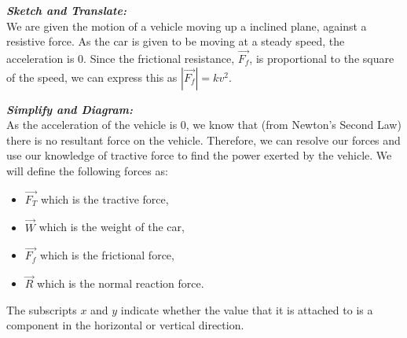 %
%
%


\begin{subquestions}
	
\subquestion

\textbf{\textit{Sketch and Translate:}} \\
We are given the motion of a vehicle moving up a inclined plane, against a resistive force. As the car is given to be moving at a steady speed, the acceleration is 0. Since the frictional resistance, $\vec{F_f}$, is proportional to the square of the speed, we can express this as $|\vec{F_f}| = kv^2$.
	

	
	
\textbf{\textit{Simplify and Diagram:}} \\	
As the acceleration of the vehicle is 0, we know that (from Newton's Second Law) there is no resultant force on the vehicle. Therefore, we can resolve our forces and use our knowledge of tractive force to find the power exerted by the vehicle. We will define the following forces as:
\begin{itemize}
	\item $\vec{F_T}$ which is the tractive force,
	\item $\vec{W}$ which is the weight of the car,
	\item $\vec{F_f}$ which is the frictional force,
	\item $\vec{R}$ which is the normal reaction force.
\end{itemize}
The subscripts $x$ and $y$ indicate whether the value that it is attached to is a component in the horizontal or vertical direction.



\end{subquestions}
